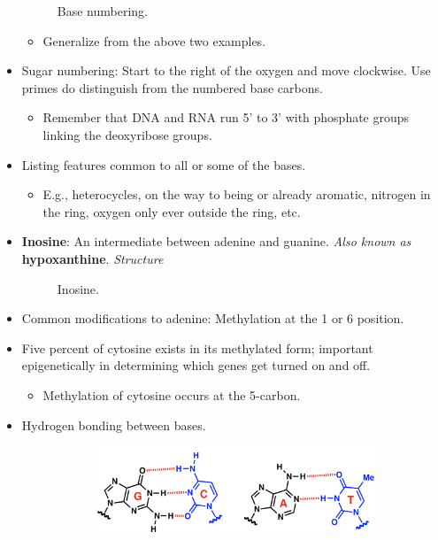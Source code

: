 \documentclass[../notes.tex]{subfiles}
\begin{document}
\begin{itemize}
\begin{figure}[h!]
        \caption{Base numbering.}
        \label{fig:baseNumbering}
    \end{figure}
    \begin{itemize}
        \item Generalize from the above two examples.
    \end{itemize}
    \item Sugar numbering: Start to the right of the oxygen and move clockwise. Use primes do distinguish from the numbered base carbons.
    \begin{itemize}
        \item Remember that DNA and RNA run 5' to 3' with phosphate groups linking the deoxyribose groups.
    \end{itemize}
    \item Listing features common to all or some of the bases.
    \begin{itemize}
        \item E.g., heterocycles, on the way to being or already aromatic, nitrogen in the ring, oxygen only ever outside the ring, etc.
    \end{itemize}
    \item \textbf{Inosine}: An intermediate between adenine and guanine. \emph{Also known as} \textbf{hypoxanthine}. \emph{Structure}
    \begin{figure}[h!]
        \centering
        \footnotesize
        \caption{Inosine.}
        \label{fig:inosine}
    \end{figure}
    \item Common modifications to adenine: Methylation at the 1 or 6 position.
    \item Five percent of cytosine exists in its methylated form; important epigenetically in determining which genes get turned on and off.
    \begin{itemize}
        \item Methylation of cytosine occurs at the 5-carbon.
    \end{itemize}
    \item Hydrogen bonding between bases.
    \begin{figure}[H]
        \centering
        \begin{subfigure}[b]{0.45\linewidth}
            \centering
            \includegraphics[width=\linewidth]{../ExtFiles/hBondinga.png}

\end{subfigure}
\end{figure}
\end{itemize}
\end{document}
